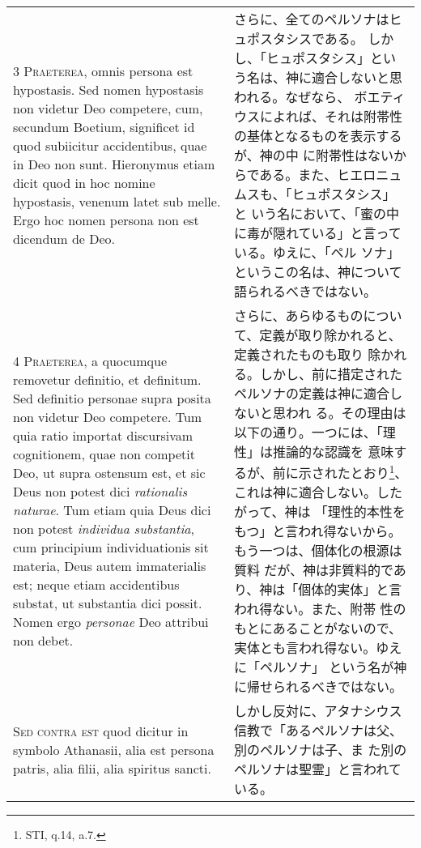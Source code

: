 \documentclass[10pt]{jsarticle} %
\begin{document}
\begin{longtable}{p{21em}p{21em}}
3 {\scshape Praeterea}, omnis persona est hypostasis. Sed nomen hypostasis non
videtur Deo competere, cum, secundum Boetium, significet id quod
subiicitur accidentibus, quae in Deo non sunt. Hieronymus etiam dicit
quod in hoc nomine hypostasis, venenum latet sub melle. Ergo hoc nomen
persona non est dicendum de Deo.


&

さらに、全てのペルソナはヒュポスタシスである。
しかし、「ヒュポスタシス」という名は、神に適合しないと思われる。なぜなら、
 ボエティウスによれば、それは附帯性の基体となるものを表示するが、神の中
 に附帯性はないからである。また、ヒエロニュムスも、「ヒュポスタシス」と
 いう名において、「蜜の中に毒が隠れている」と言っている。ゆえに、「ペル
 ソナ」というこの名は、神について語られるべきではない。

\\



4 {\scshape Praeterea}, a quocumque removetur definitio, et definitum. Sed definitio
personae supra posita non videtur Deo competere. Tum quia ratio importat
discursivam cognitionem, quae non competit Deo, ut supra ostensum est,
et sic Deus non potest dici {\itshape rationalis naturae}. Tum etiam quia Deus dici
non potest {\itshape individua substantia}, cum principium individuationis sit
materia, Deus autem immaterialis est; neque etiam accidentibus substat,
ut substantia dici possit. Nomen ergo {\itshape personae} Deo attribui non debet.


&

さらに、あらゆるものについて、定義が取り除かれると、定義されたものも取り
 除かれる。しかし、前に措定されたペルソナの定義は神に適合しないと思われ
 る。その理由は以下の通り。一つには、「理性」は推論的な認識を
 意味するが、前に示されたとおり\footnote{STI, q.14, a.7.}、これは神に適合しない。したがって、神は
 「理性的本性をもつ」と言われ得ないから。もう一つは、個体化の根源は質料
 だが、神は非質料的であり、神は「個体的実体」と言われ得ない。また、附帯
 性のもとにあることがないので、実体とも言われ得ない。ゆえに「ペルソナ」
 という名が神に帰せられるべきではない。


\\



{\scshape Sed contra est} quod dicitur in symbolo Athanasii, alia est persona
patris, alia filii, alia spiritus sancti.


&

しかし反対に、アタナシウス信教で「あるペルソナは父、別のペルソナは子、ま
 た別のペルソナは聖霊」と言われている。



\end{longtable}
\end{document}
